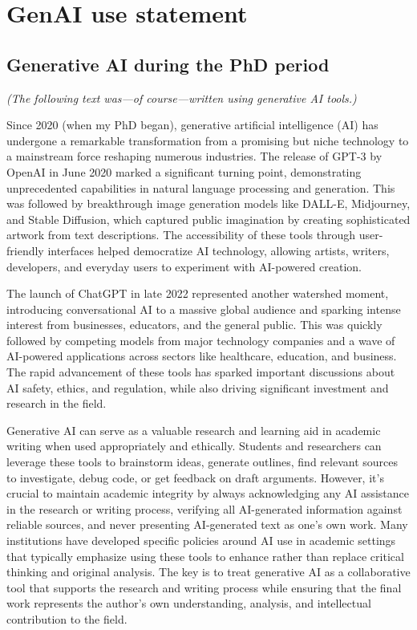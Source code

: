 \chapter{GenAI use statement}
\label{appendix:ai}

\section*{Generative AI during the PhD period}

\textit{(The following text was---of course---written using generative AI tools.)}

Since 2020 (when my PhD began), generative artificial intelligence (AI) has undergone a remarkable transformation from a promising but niche technology to a mainstream force reshaping numerous industries.
The release of GPT-3 by OpenAI in June 2020 marked a significant turning point, demonstrating unprecedented capabilities in natural language processing and generation.
This was followed by breakthrough image generation models like DALL-E, Midjourney, and Stable Diffusion, which captured public imagination by creating sophisticated artwork from text descriptions.
The accessibility of these tools through user-friendly interfaces helped democratize AI technology, allowing artists, writers, developers, and everyday users to experiment with AI-powered creation.

The launch of ChatGPT in late 2022 represented another watershed moment, introducing conversational AI to a massive global audience and sparking intense interest from businesses, educators, and the general public.
This was quickly followed by competing models from major technology companies and a wave of AI-powered applications across sectors like healthcare, education, and business.
The rapid advancement of these tools has sparked important discussions about AI safety, ethics, and regulation, while also driving significant investment and research in the field.

Generative AI can serve as a valuable research and learning aid in academic writing when used appropriately and ethically.
Students and researchers can leverage these tools to brainstorm ideas, generate outlines, find relevant sources to investigate, debug code, or get feedback on draft arguments.
However, it's crucial to maintain academic integrity by always acknowledging any AI assistance in the research or writing process, verifying all AI-generated information against reliable sources, and never presenting AI-generated text as one's own work.
Many institutions have developed specific policies around AI use in academic settings that typically emphasize using these tools to enhance rather than replace critical thinking and original analysis.
The key is to treat generative AI as a collaborative tool that supports the research and writing process while ensuring that the final work represents the author's own understanding, analysis, and intellectual contribution to the field.

